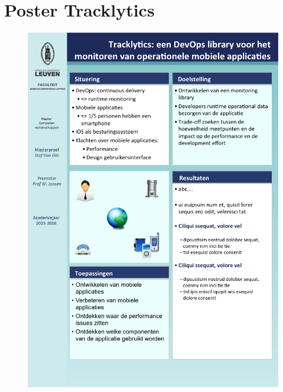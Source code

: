\chapter{Poster Tracklytics}
\begin{figure}[!h]
  \centering
  \includegraphics[scale=0.6]{Afbeeldingen/Appendix/Poster/dia1}
\end{figure}
